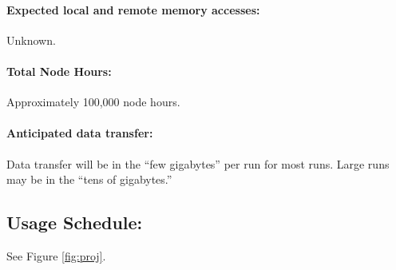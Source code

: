 \documentclass[letterpaper]{article}
\begin{document}
\paragraph{Expected local and remote memory accesses:} Unknown. 
\paragraph{Total Node Hours:} Approximately 100,000 node hours.
\paragraph{Anticipated data transfer:} Data transfer will be in the ``few 
gigabytes'' per run for most runs. Large runs may be in the ``tens of 
gigabytes.''





\subsection{Usage Schedule:} See Figure \ref{fig:proj}.

 



\pagebreak


\end{document}
